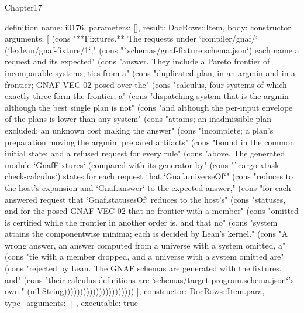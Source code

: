 \begin{lexlean}{Chapter17}
\begin{semanticmodule}
definition{
  name: i0176,
  parameters: [],
  result: DocRows::Item,
  body: constructor{
    arguments: [
      (cons "**Fixtures.** The requests under `compiler/gnaf/` (`lexlean/gnaf-fixture/1`," (cons "`schemas/gnaf-fixture.schema.json`) each name a request and its expected" (cons "answer. They include a Pareto frontier of incomparable systems; ties from a" (cons "duplicated plan, in an argmin and in a frontier; GNAF-VEC-02 posed over the" (cons "calculus, four systems of which exactly three form the frontier; a" (cons "dispatching system that is the argmin although the best single plan is not" (cons "and although the per-input envelope of the plans is lower than any system" (cons "attains; an inadmissible plan excluded; an unknown cost making the answer" (cons "incomplete; a plan's preparation moving the argmin; prepared artifacts" (cons "bound in the common initial state; and a refused request for every rule" (cons "above. The generated module `GnafFixtures` (compared with its generator by" (cons "`cargo xtask check-calculus`) states for each request that `Gnaf.universeOf`" (cons "reduces to the host's expansion and `Gnaf.answer` to the expected answer," (cons "for each answered request that `Gnaf.statusesOf` reduces to the host's" (cons "statuses, and for the posed GNAF-VEC-02 that no frontier with a member" (cons "omitted is certified while the frontier in another order is, and that no" (cons "system attains the componentwise minima; each is decided by Lean's kernel." (cons "A wrong answer, an answer computed from a universe with a system omitted, a" (cons "tie with a member dropped, and a universe with a system omitted are" (cons "rejected by Lean. The GNAF schemas are generated with the fixtures, and" (cons "their calculus definitions are `schemas/target-program.schema.json`'s own." (nil String))))))))))))))))))))))
    ],
    constructor: DocRows::Item.para,
    type_arguments: []
  },
  executable: true
}


\end{semanticmodule}
\end{lexlean}
